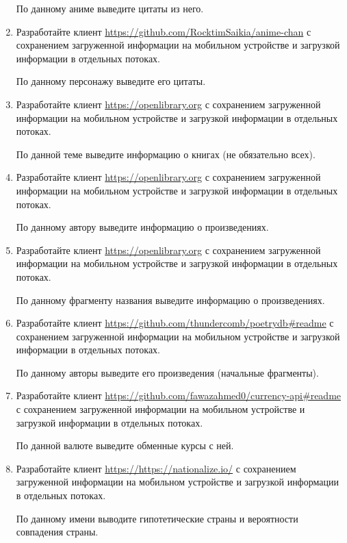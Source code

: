\begin{enumerate}
		По данному аниме выведите цитаты из него.


	\item Разработайте клиент \url{https://github.com/RocktimSaikia/anime-chan} с сохранением загруженной информации на мобильном устройстве и загрузкой
		информации в отдельных потоках. 

		По данному персонажу выведите его цитаты.

	\item Разработайте клиент \url{https://openlibrary.org} с сохранением загруженной информации на мобильном устройстве и загрузкой
		информации в отдельных потоках. 

		По данной теме выведите информацию о книгах (не обязательно всех).

	\item Разработайте клиент \url{https://openlibrary.org} с сохранением загруженной информации на мобильном устройстве и загрузкой
		информации в отдельных потоках. 

		По данному автору выведите информацию о произведениях.

	\item Разработайте клиент \url{https://openlibrary.org} с сохранением загруженной информации на мобильном устройстве и загрузкой
		информации в отдельных потоках. 

		По данному фрагменту названия выведите информацию о произведениях.

	\item Разработайте клиент \url{https://github.com/thundercomb/poetrydb#readme} с сохранением загруженной информации на мобильном устройстве и загрузкой
		информации в отдельных потоках. 

		По данному авторы выведите его произведения (начальные фрагменты).

	\item Разработайте клиент \url{https://github.com/fawazahmed0/currency-api#readme} с сохранением загруженной информации на мобильном устройстве и загрузкой
		информации в отдельных потоках. 

		По данной валюте выведите обменные курсы с ней.
		
	\item Разработайте клиент \url{https://https://nationalize.io/} с сохранением загруженной информации на мобильном устройстве и загрузкой
		информации в отдельных потоках. 

		По данному имени выводите гипотетические страны и вероятности совпадения страны.


\end{enumerate}
